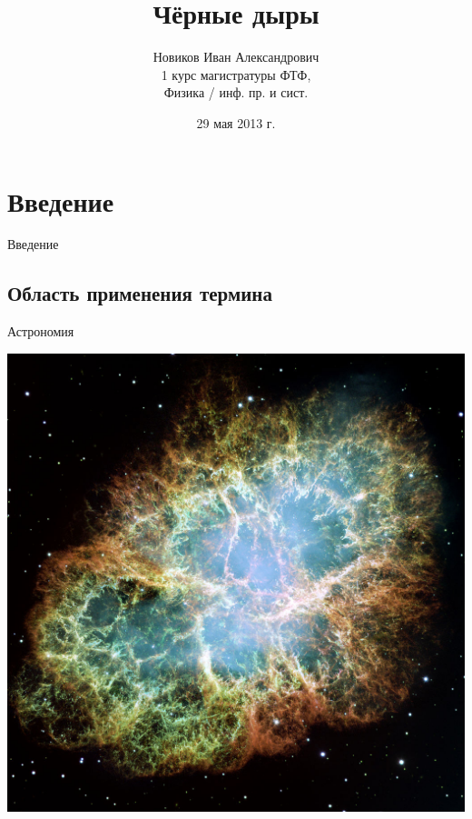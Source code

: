 \documentclass[usenames,dvipsnames,pdftex,unicode,hidelinks]{beamer}
\title[Чёрные дыры]{Чёрные дыры}
\author[Иван Новиков]{
  Новиков Иван Александрович
  \\
  \vspace{0.5cm}
  \small 1 курс магистратуры ФТФ,\\
         Физика / инф. пр. и сист.
}
\institute{Кубанский Государственный Университет}
\date{ 29 мая 2013 г. }
\newcommand{\splashsection}[1]{
    \section{#1}
    \begin{frame}[plain]
      \begin{center}
        \LARGE #1
      \end{center}
    \end{frame}
  }
\begin{document}
  
  \begin{frame}[plain]
    \titlepage
  \end{frame}

  \splashsection{Введение}
  \subsection{Область применения термина}

  \begin{frame}{Астрономия}
    \begin{center}
      \includegraphics[height=0.8\textheight]{crab-nebula}
     \end{center}
  \end{frame}
\end{document}
